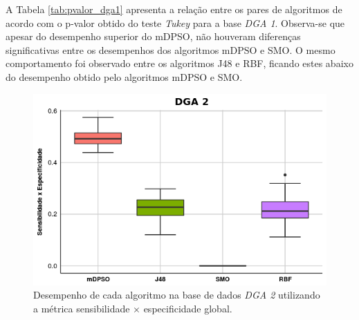 \documentclass[
	12pt,				%
	openany,			%
	oneside,	
	a4paper,			%
	brazil,				%
	]{unimontes-ppgmsc-abntex2}
\begin{document}
A Tabela \ref{tab:pvalor_dga1} apresenta a relação entre os pares de algoritmos de acordo com o p-valor obtido do teste {\em Tukey} para a base {\em DGA 1}. Observa-se que apesar do desempenho superior do mDPSO, não houveram diferenças significativas entre os desempenhos dos algoritmos mDPSO e SMO. O mesmo comportamento foi observado entre os algoritmos J48 e RBF, ficando estes abaixo do desempenho obtido pelo algoritmos mDPSO e SMO.

\begin{table}[!ht]
\setlength{\arrayrulewidth}{.2em}
\vspace{12pt}
\centering{}
\caption{p-valor medido para o produto da sensibilidade pela especificidade global de cada algoritmo na base de dados {\em DGA 1}.}
\label{tab:pvalor_dga1}
\end{table}

\begin{figure}[!ht]
\centering
\includegraphics[scale=.7]{graficos/DGA2}
\caption{Desempenho de cada algoritmo na base de dados {\em DGA 2} utilizando a métrica sensibilidade $\times$ especificidade global.}
\label{fig:dga_2}
\end{figure}
\end{document}
